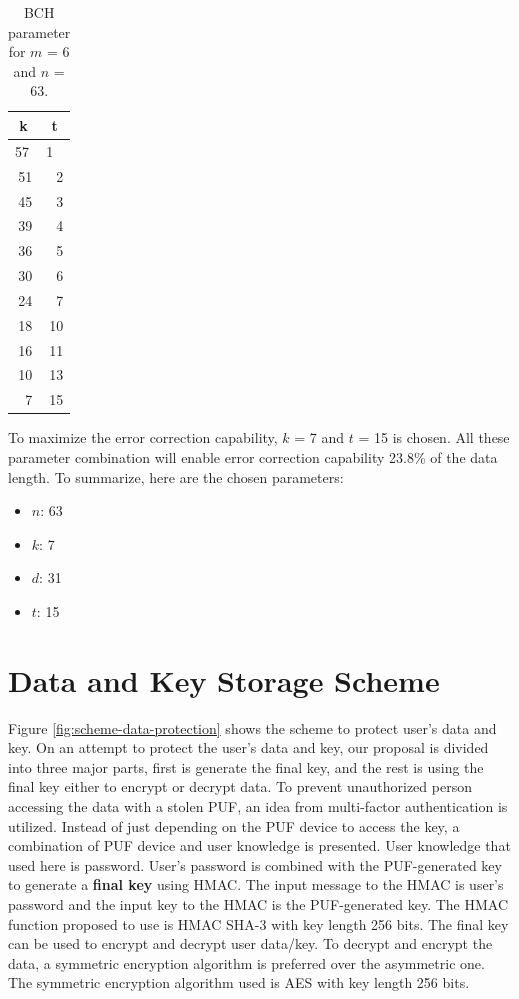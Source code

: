 \begin{table}[htbp]
  \centering
  \caption{BCH parameter for $m$ = 6 and $n$ = 63.}
    \begin{tabular}{|r|r|}
    \hline
    \multicolumn{1}{|c|}{\textbf{k}} & \multicolumn{1}{c|}{\textbf{t}} \\
    \hline
    \multicolumn{1}{|l|}{57} & \multicolumn{1}{l|}{1} \\
    \hline
    51    & 2 \\
    \hline
    45    & 3 \\
    \hline
    39    & 4 \\
    \hline
    36    & 5 \\
    \hline
    30    & 6 \\
    \hline
    24    & 7 \\
    \hline
    18    & 10 \\
    \hline
    16    & 11 \\
    \hline
    10    & 13 \\
    \hline
    7     & 15 \\
    \hline
    \end{tabular}%
  \label{tab:bch}%
\end{table}%
To maximize the error correction capability, $k$ = 7 and $t$ = 15 is chosen. All these parameter combination will enable error correction capability 23.8\% of the data length. To summarize, here are the chosen parameters:
\begin{itemize}
\item $n$: 63
\item $k$: 7
\item $d$: 31
\item $t$: 15
\end{itemize}

\section{Data and Key Storage Scheme} \label{chp:data_protection_scheme}

Figure \ref{fig:scheme-data-protection} shows the scheme to protect user's data and key. On an attempt to protect the user's data and key, our proposal is divided into three major parts, first is generate the final key, and the rest is using the final key either to encrypt or decrypt data.
To prevent unauthorized person accessing the data with a stolen PUF, an idea from multi-factor authentication is utilized. Instead of just depending on the PUF device to access the key, a combination of PUF device and user knowledge is presented. User knowledge that used here is password.
User's password is combined with the PUF-generated key to generate a \textbf{final key} using HMAC. The input message to the HMAC is user's password and the input key to the HMAC is the PUF-generated key. The HMAC function proposed to use is HMAC SHA-3 with key length 256 bits.
The final key can be used to encrypt and decrypt user data/key. To decrypt and encrypt the data, a symmetric encryption algorithm is preferred over the asymmetric one. The symmetric encryption algorithm used is AES with key length 256 bits.

